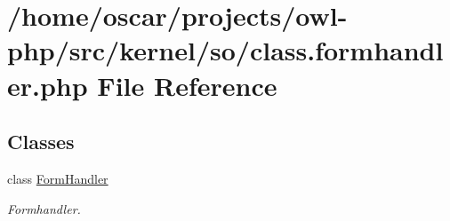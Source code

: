 \section{/home/oscar/projects/owl-\/php/src/kernel/so/class.formhandler.php File Reference}
\label{class_8formhandler_8php}
\subsection*{Classes}
\begin{DoxyCompactItemize}
\item 
class \hyperlink{classFormHandler}{FormHandler}
\begin{DoxyCompactList}\small\item\em Formhandler. \item\end{DoxyCompactList}\end{DoxyCompactItemize}
